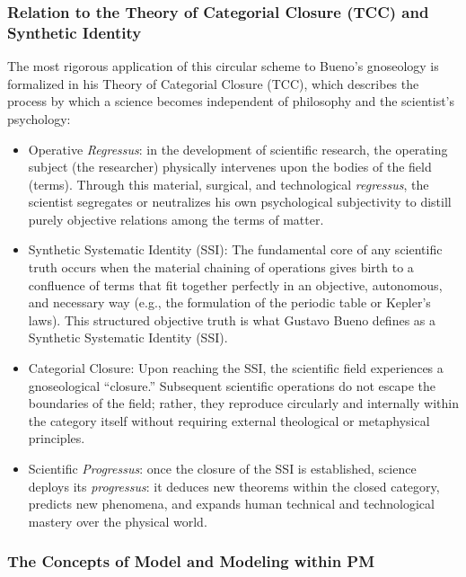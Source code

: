\documentclass[11pt, a4paper]{article}
\begin{document}
\subsubsection*{Relation to the Theory of Categorial Closure (TCC) and Synthetic Identity}
The most rigorous application of this circular scheme to Bueno's gnoseology is formalized in his \textrm{Theory of Categorial Closure (TCC)}, which describes the process by which a science becomes independent of philosophy and the scientist's psychology:
\begin{itemize}
	\item \textrm{Operative \textit{Regressus}:} in the development of scientific research, the operating subject (the researcher) physically intervenes upon the bodies of the field (terms). Through this material, surgical, and technological \textit{regressus}, the scientist segregates or neutralizes his own psychological subjectivity to distill purely objective relations among the terms of matter.
	\item \textrm{Synthetic Systematic Identity (SSI):} The fundamental core of any scientific truth occurs when the material chaining of operations gives birth to a confluence of terms that fit together perfectly in an objective, autonomous, and necessary way (e.g., the formulation of the periodic table or Kepler's laws). This structured objective truth is what Gustavo Bueno defines as a \textrm{Synthetic Systematic Identity (SSI)}.
	\item \textrm{Categorial Closure:} Upon reaching the SSI, the scientific field experiences a gnoseological ``closure.'' Subsequent scientific operations do not escape the boundaries of the field; rather, they reproduce circularly and internally within the category itself without requiring external theological or metaphysical principles.
	\item \textrm{Scientific \textit{Progressus}:} once the closure of the SSI is established, science deploys its \textit{progressus}: it deduces new theorems within the closed category, predicts new phenomena, and expands human technical and technological mastery over the physical world.
\end{itemize}



\subsubsection{The Concepts of Model and Modeling within PM} \label{sec:model_pm}
\end{document}
